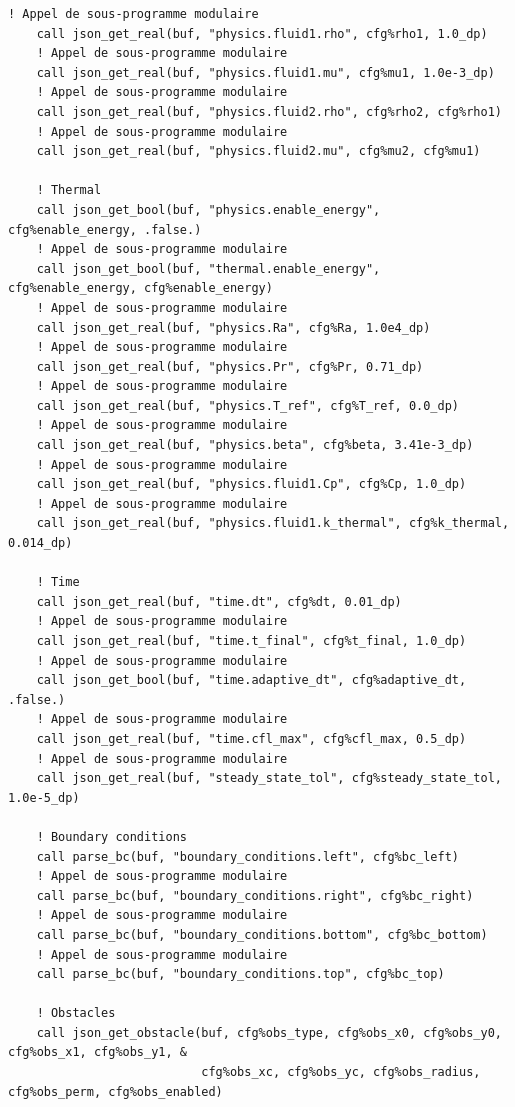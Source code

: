 \documentclass[10pt,a4paper,oneside]{book}
\begin{document}
\begin{lstlisting}[language={[95]Fortran}]
    ! Appel de sous-programme modulaire
    call json_get_real(buf, "physics.fluid1.rho", cfg%rho1, 1.0_dp)
    ! Appel de sous-programme modulaire
    call json_get_real(buf, "physics.fluid1.mu", cfg%mu1, 1.0e-3_dp)
    ! Appel de sous-programme modulaire
    call json_get_real(buf, "physics.fluid2.rho", cfg%rho2, cfg%rho1)
    ! Appel de sous-programme modulaire
    call json_get_real(buf, "physics.fluid2.mu", cfg%mu2, cfg%mu1)

    ! Thermal
    call json_get_bool(buf, "physics.enable_energy", cfg%enable_energy, .false.)
    ! Appel de sous-programme modulaire
    call json_get_bool(buf, "thermal.enable_energy", cfg%enable_energy, cfg%enable_energy)
    ! Appel de sous-programme modulaire
    call json_get_real(buf, "physics.Ra", cfg%Ra, 1.0e4_dp)
    ! Appel de sous-programme modulaire
    call json_get_real(buf, "physics.Pr", cfg%Pr, 0.71_dp)
    ! Appel de sous-programme modulaire
    call json_get_real(buf, "physics.T_ref", cfg%T_ref, 0.0_dp)
    ! Appel de sous-programme modulaire
    call json_get_real(buf, "physics.beta", cfg%beta, 3.41e-3_dp)
    ! Appel de sous-programme modulaire
    call json_get_real(buf, "physics.fluid1.Cp", cfg%Cp, 1.0_dp)
    ! Appel de sous-programme modulaire
    call json_get_real(buf, "physics.fluid1.k_thermal", cfg%k_thermal, 0.014_dp)

    ! Time
    call json_get_real(buf, "time.dt", cfg%dt, 0.01_dp)
    ! Appel de sous-programme modulaire
    call json_get_real(buf, "time.t_final", cfg%t_final, 1.0_dp)
    ! Appel de sous-programme modulaire
    call json_get_bool(buf, "time.adaptive_dt", cfg%adaptive_dt, .false.)
    ! Appel de sous-programme modulaire
    call json_get_real(buf, "time.cfl_max", cfg%cfl_max, 0.5_dp)
    ! Appel de sous-programme modulaire
    call json_get_real(buf, "steady_state_tol", cfg%steady_state_tol, 1.0e-5_dp)

    ! Boundary conditions
    call parse_bc(buf, "boundary_conditions.left", cfg%bc_left)
    ! Appel de sous-programme modulaire
    call parse_bc(buf, "boundary_conditions.right", cfg%bc_right)
    ! Appel de sous-programme modulaire
    call parse_bc(buf, "boundary_conditions.bottom", cfg%bc_bottom)
    ! Appel de sous-programme modulaire
    call parse_bc(buf, "boundary_conditions.top", cfg%bc_top)

    ! Obstacles
    call json_get_obstacle(buf, cfg%obs_type, cfg%obs_x0, cfg%obs_y0, cfg%obs_x1, cfg%obs_y1, &
                           cfg%obs_xc, cfg%obs_yc, cfg%obs_radius, cfg%obs_perm, cfg%obs_enabled)


\end{lstlisting}
\end{document}
